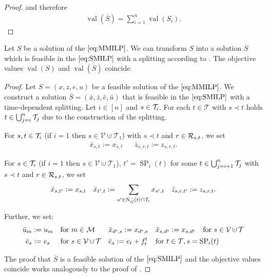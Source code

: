 \begin{proof}
and therefore
\begin{align*}
	\operatorname{val}\left(\overline{S}\right) = \sum_{i=1}^n \operatorname{val}\left(S_i\right).
\end{align*}
%
\end{proof}

\begin{lemma}
\label{lem:equivalence_MMILP_SMILP}

Let $S$ be a solution of the $\eqref{eq:MMILP}$. We can transform $S$ into a solution $\overline{S}$ which is feasible in the $\eqref{eq:SMILP}$ with a splitting according to . The objective values $\operatorname{val}(S)$ and $\operatorname{val}(\overline{S})$ coincide.

\end{lemma}

\begin{proof}

Let ${S=\left(x,z,e,u\right)}$ be a feasible solution of the $\eqref{eq:MMILP}$. We construct a solution ${\overline{S}=\left(\bar{x},\bar{z},\bar{e},\bar{u}\right)}$ that is feasible in the $\eqref{eq:SMILP}$ with a time-dependent splitting. Let $i\in[n]$ and ${s\in\mathcal{T}_i}$. For each ${t\in\mathcal{T}}$ with ${s\prec t}$ holds ${t\in\bigcup_{j=i}^n\mathcal{T}_j}$ due to the construction of the splitting.

For ${s,t\in\mathcal{T}_i}$ (if $i=1$ then $s\in\mathcal{V}\cupdot\mathcal{T}_1$) with ${s\prec t}$ and ${r\in\mathcal{R}_{s,t}}$, we set
\begin{align*}
	\bar{x}_{s,t} := x_{s,t} && \bar{z}_{s,r,t} := z_{s,r,t}.
\end{align*}

For ${s\in\mathcal{T}_i}$ (if $i=1$ then $s\in\mathcal{V}\cupdot\mathcal{T}_1$), ${t'=\operatorname{SP}_i(t)}$ for some ${t\in\bigcup_{j=i+1}^n\mathcal{T}_j}$ with ${s\prec t}$ and ${r\in\mathcal{R}_{s,t}}$, we set
\begin{align*}
	\bar{x}_{s,t'} := x_{s,t} && \bar{x}_{t',t} := \sum_{s'\in\operatorname{N}_G^-(t)\cap\mathcal{T}_i} x_{s',t} && \bar{z}_{s,r,t'} := z_{s,r,t}.
\end{align*}

Further, we set:
\begin{align*}
	\bar{u}_m & := u_m && \text{for } m\in\mathcal{M} && \bar{x}_{\ds,s} := x_{\ds,s} && \bar{x}_{s,\de} := x_{s,\de} && \text{for } s\in\mathcal{V}\cupdot\mathcal{T} \\
	\bar{e}_s & := e_s && \text{for } s\in\mathcal{V}\cupdot\mathcal{T} && \bar{e}_s := e_t + \ft_t && \omit\rlap{for $t\in\mathcal{T}, s=\operatorname{SP}_i(t)$}
\end{align*}

The proof that $\overline{S}$ is a feasible solution of the $\eqref{eq:SMILP}$ and the objective values coincide works analogously to the proof of .
%
\end{proof}

